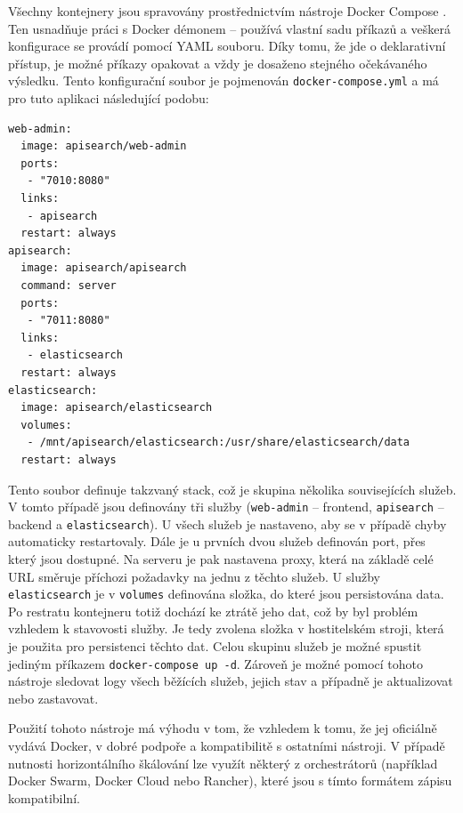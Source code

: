 \documentclass[FM,DP]{tulthesis}
\newenvironment{code}
    {\filbreak\captionsetup{type=listing}}{\filbreak}
\begin{document}
Všechny kontejnery jsou spravovány prostřednictvím nástroje Docker Compose \cite{compose}.
Ten usnadňuje práci s Docker démonem -- používá vlastní sadu příkazů a veškerá konfigurace
se provádí pomocí YAML souboru. Díky tomu, že jde o deklarativní přístup, je možné
příkazy opakovat a vždy je dosaženo stejného očekávaného výsledku. Tento konfigurační 
soubor je pojmenován \verb|docker-compose.yml| a má pro tuto aplikaci následující podobu:

\begin{code}
\captionsetup{singlelinecheck=false,justification=raggedright}
\label{code:docker-compose}
\begin{verbatim}
web-admin:
  image: apisearch/web-admin
  ports:
   - "7010:8080"
  links:
   - apisearch
  restart: always
apisearch:
  image: apisearch/apisearch
  command: server
  ports:
   - "7011:8080"
  links:
   - elasticsearch
  restart: always
elasticsearch:
  image: apisearch/elasticsearch
  volumes:
   - /mnt/apisearch/elasticsearch:/usr/share/elasticsearch/data
  restart: always
\end{verbatim}
\end{code}

Tento soubor definuje takzvaný stack, což je skupina několika souvisejících služeb. V tomto
případě jsou definovány tři služby (\verb|web-admin| -- frontend, \verb|apisearch| -- backend 
a \verb|elasticsearch|). U všech služeb je nastaveno, aby se v případě chyby automaticky restartovaly.
Dále je u prvních dvou služeb definován port, přes který jsou dostupné. Na serveru je pak 
nastavena proxy, která na základě celé URL směruje příchozi požadavky na jednu z těchto služeb.
U služby \verb|elasticsearch| je v \verb|volumes| definována složka, do které jsou persistována
data. Po restratu kontejneru totiž dochází ke ztrátě jeho dat, což by byl problém vzhledem
k stavovosti služby. Je tedy zvolena složka v hostitelském stroji, která je použita pro persistenci
těchto dat. Celou skupinu služeb je možné spustit jediným příkazem \verb|docker-compose up -d|.
Zároveň je možné pomocí tohoto nástroje sledovat logy všech běžících služeb, jejich stav
a případně je aktualizovat nebo zastavovat.

Použití tohoto nástroje má výhodu v tom, že vzhledem k tomu, že jej oficiálně vydává Docker, 
v dobré podpoře a kompatibilitě s ostatními nástroji. V případě nutnosti horizontálního škálování
lze využít některý z orchestrátorů \cite[strana~300]{devops} (například Docker Swarm, Docker Cloud 
nebo Rancher), které jsou s tímto formátem zápisu kompatibilní. 
\end{document}

